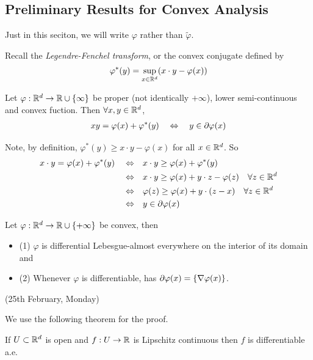 \documentclass[12pt,a4paper]{article}
\newenvironment{proof}
{\begin{changemargin}{1cm}{0.5cm} 
	}%
	{\end{changemargin}
}
\renewenvironment{i}
{\begin{itemize} 
	}%
	{\end{itemize}
}
\newenvironment{p}
{\begin{proof} 
	}%
	{\end{proof}
}
\begin{document}
\subsection{Preliminary Results for Convex Analysis}

Just in this seciton, we will write $\varphi$ rather than $\tilde{\varphi}$.
\s

Recall the \emph{Legendre-Fenchel transform}, or the convex conjugate defined by
\begin{align*}
\varphi^*(y) = \sup_{x\in \mathbb{R}^d} (x\cdot y - \varphi(x))
\end{align*}
\s

 Let $\varphi : \mathbb{R}^d \rightarrow \mathbb{R}\cup \{\infty\}$ be proper (not identically $+ \infty$), lower semi-continuous and convex fuction. Then $\forall x, y\in \mathbb{R}^d$, 
\begin{align*}
xy = \varphi(x) + \varphi^*(y) \quad \Leftrightarrow \quad y\in \partial \varphi(x)
\end{align*}
\begin{p}
\pf Note, by definition, $\varphi^*(y) \geq x\cdot y - \varphi(x)$ for all $x\in \mathbb{R}^d$. So
\begin{align*}
x\cdot y= \varphi(x) + \varphi^*(y) \quad \Leftrightarrow & \quad x\cdot y \geq \varphi(x) + \varphi^*(y) \\
\Leftrightarrow & \quad x\cdot y \geq \varphi(x) + y\cdot z - \varphi(z) \quad \forall z\in \mathbb{R}^d \\
\Leftrightarrow & \quad \varphi(z) \geq \varphi(x) + y\cdot(z-x) \quad \forall z\in \mathbb{R}^d \\
\Leftrightarrow & \quad y\in \partial \varphi(x)
\end{align*}
\eop
\end{p}
\s

 Let $\varphi : \mathbb{R}^d \rightarrow \mathbb{R} \cup \{+\infty \}$ be convex, then
\begin{i}
\item[(1)] $\varphi$ is differential Lebesgue-almost everywhere on the interior of its domain and
\item[(2)] Whenever $\varphi$ is differentiable, has $\partial \varphi(x) = \{\nabla \varphi(x) \}$.
\end{i}
\s

\newday

(25th February, Monday)
\s

We use the following theorem for the proof.
\s

 If $U\subset \mathbb{R}^d$ is open and $f:U\rightarrow \mathbb{R}$ is Lipschitz continuous then $f$ is differentiable a.e.
\end{document}

